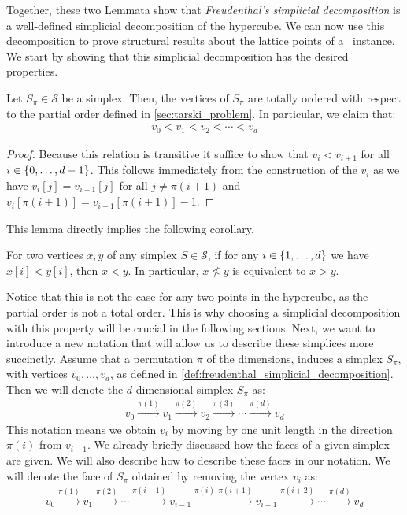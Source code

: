 Together, these two Lemmata show that \textit{Freudenthal's simplicial decomposition} is a well-defined simplicial decomposition of the hypercube. We can now use this decomposition to prove structural results about the lattice points of a \Tarski\ instance. We start by showing that this simplicial decomposition has the desired properties.
\begin{lemma}\label{lem:total_order_freudenthal}
	Let $S_{\pi} \in \mathcal{S}$ be a simplex. Then, the vertices of $S_{\pi}$ are totally ordered with respect to the partial order defined in \cref{sec:tarski_problem}. In particular, we claim that:
	\begin{align*}
		v_0 < v_1 < v_2 < \cdots < v_d
	\end{align*}
\end{lemma}
\begin{proof}
	Because this relation is transitive it suffice to show that $v_i < v_{i+1}$ for all $i \in \left\{0, \dots, d-1\right\}$. This follows immediately from the construction of the $v_i$ as we have $v_i[j] = v_{i+1}[j]$ for all $j \neq \pi(i+1)$ and $v_i[\pi(i+1)] = v_{i+1}[\pi(i+1)] - 1$.
\end{proof}
This lemma directly implies the following corollary.
\begin{corollary}\label{cor:total_ordering}
	For two vertices $x,y$ of any simplex $S \in \mathcal{S}$, if for any $i \in \left\{1, \dots, d\right\}$ we have $x[i] < y[i]$, then $x < y$. In particular, $x \not\leq y$ is equivalent to $x > y$.
\end{corollary}
Notice that this is not the case for any two points in the hypercube, as the partial order is not a total order. This is why choosing a simplicial decomposition with this property will be crucial in the following sections. Next, we want to introduce a new notation that will allow us to describe these simplices more succinctly. Assume that a permutation $\pi$ of the dimensions, induces a simplex $S_{\pi}$, with vertices $v_0, \dots, v_d$, as defined in \cref{def:freudenthal_simplicial_decomposition}. Then we will denote the $d$-dimensional simplex $S_{\pi}$ as:
\begin{align*}
	v_0 \xrightarrow{\pi(1)} v_1 \xrightarrow{\pi(2)} v_2 \xrightarrow{\pi(3)} \cdots \xrightarrow{\pi(d)} v_d
\end{align*}
This notation means we obtain $v_i$ by moving by one unit length in the direction $\pi(i)$ from $v_{i-1}$. We already briefly discussed how the faces of a given simplex are given. We will also describe how to describe these faces in our notation. We will denote the face of $S_{\pi}$ obtained by removing the vertex $v_i$ as:
\begin{align*}
	v_0 \xrightarrow{\pi(1)} v_1 \xrightarrow{\pi(2)} \cdots \xrightarrow{\pi(i - 1)} v_{i-1} \xrightarrow{\pi(i), \pi(i+1)} v_{i+1} \xrightarrow{\pi(i+2)} \cdots \xrightarrow{\pi(d)} v_d
\end{align*}

